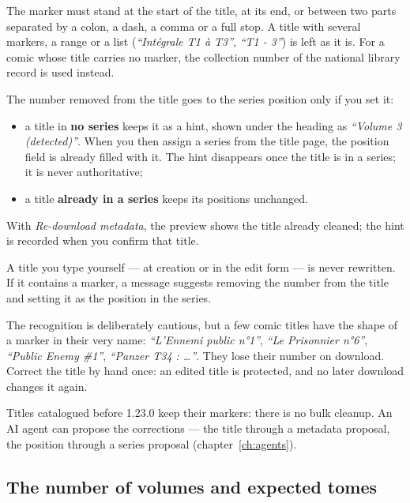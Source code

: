 The marker must stand at the start of the title, at its end, or
between two parts separated by a colon, a dash, a comma or a full
stop. A title with several markers, a range or a list (\emph{``Intégrale
T1 à T3''}, \emph{``T1 - 3''}) is left as it is. For a comic whose
title carries no marker, the collection number of the national
library record is used instead.

The number removed from the title goes to the series position only if
you set it:

\begin{itemize}
  \item a title in \textbf{no series} keeps it as a hint, shown under
        the heading as \emph{``Volume 3 (detected)''}. When you then
        assign a series from the title page, the position field is
        already filled with it. The hint disappears once the title is
        in a series; it is never authoritative;
  \item a title \textbf{already in a series} keeps its positions
        unchanged.
\end{itemize}

With \emph{Re-download metadata}, the preview shows the title already
cleaned; the hint is recorded when you confirm that title.

A title you type yourself --- at creation or in the edit form --- is
never rewritten. If it contains a marker, a message suggests removing
the number from the title and setting it as the position in the
series.

\begin{warning}
The recognition is deliberately cautious, but a few comic titles have
the shape of a marker in their very name: \emph{``L'Ennemi public
n°1''}, \emph{``Le Prisonnier n°6''}, \emph{``Public Enemy \#1''},
\emph{``Panzer T34 : \dots''}. They lose their number on download.
Correct the title by hand once: an edited title is protected, and no
later download changes it again.
\end{warning}

Titles catalogued before 1.23.0 keep their markers: there is no bulk
cleanup. An AI agent can propose the corrections --- the title through
a metadata proposal, the position through a series proposal
(chapter~\ref{ch:agents}).

\subsection*{The number of volumes and expected tomes}
\label{sec:series-total}

